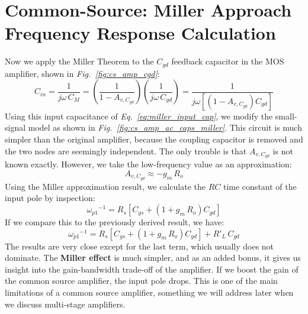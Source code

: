 \section{Common-Source:  Miller Approach Frequency Response Calculation}
Now we apply the Miller Theorem to the $C_{gd}$ feedback capacitor in the MOS amplifier, shown in \emph{Fig.~\ref{fig:cs_amp_cgd}}:  
    \begin{equation}
        C_{in} = \frac{1}{{j\omega\,C_M}} = \left(\frac{1}{1 - A_{v,C_{gd}}}\right) \left(\frac{1}{j\omega\,C_{gd}}\right)
        = \frac{1}{j\omega \left[\left(1 - A_{v,C_{gd}}\right)C_{gd}\right]}
        \label{eq:miller_input_cap}
    \end{equation}
Using this input capacitance of \emph{Eq.~\ref{eq:miller_input_cap}}, we modify the small-signal model as shown in \emph{Fig.~\ref{fig:cs_amp_ac_caps_miller}}.  This circuit is much simpler than the original amplifier, because the coupling capacitor is removed and the two nodes are seemingly independent.   The only trouble is that $A_{v,C_{gd}}$ is not known exactly.  However, we take the low-frequency value as an approximation:
    \begin{equation}
        A_{v,C_{gd}} \approx -g_m\,R_o
    \end{equation}
Using the Miller approximation result, we calculate the $RC$ time constant of the input pole by inspection:
    \begin{equation}
        {\omega _{p1}}^{-1} = R_s\left[C_{gs} + \left(1 + g_m\,R_o\right)C_{gd}\right]
    \end{equation}
If we compare this to the previously derived result, we have:
    \begin{equation} 
        {\omega _{p1}}^{-1} = R_s\left[C_{gs} + \left(1 + g_m\,R_o\right)C_{gd}\right] + R'_L\,C_{gd}
    \end{equation}
The results are very close except for the last term, which usually does not dominate.  The \textbf{Miller effect} is much simpler, and as an added bonus, it gives us insight into the gain-bandwidth trade-off of the amplifier.  If we boost the gain of the common source amplifier, the input pole drops.  This is one of the main limitations of a common source amplifier, something we will address later when we discuss multi-stage amplifiers.

